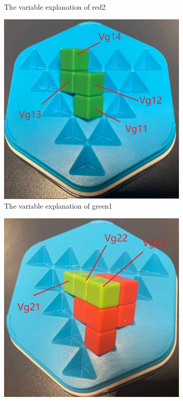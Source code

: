 \begin{figure}[htbp]
\begin{subfigure}[b]{.24\textwidth}
\caption{The variable explanation of red2}
  \label{fig:3Dred2}
\end{subfigure}
\begin{subfigure}[b]{.24\textwidth}
\centering
\includegraphics[width=\textwidth]{figs/3Dgreen1.jpg}
\caption{The variable explanation of green1}
  \label{fig:3Dgreen1}
\end{subfigure}
\begin{subfigure}[b]{.24\textwidth}
\centering
\includegraphics[width=\textwidth]{figs/3Dgreen2.jpg}

\end{subfigure}
\end{figure}
